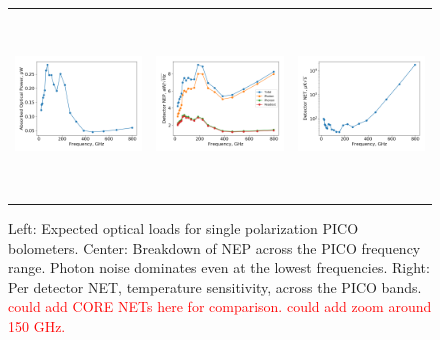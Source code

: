 \documentclass[]{spie}  %
\newcommand{\comr}[1]{\textcolor{red}{#1}}
\begin{document}
\begin{figure} [ht]
\begin{center}
\begin{tabular}{ccc} %
\hspace{-1.4cm} \includegraphics[height=4.9cm]{system_Popt.png} & \hspace{-0.7cm} \includegraphics[height=4.9cm]{system_NEP.png} &\hspace{-0.7cm}  \includegraphics[height=4.9cm]{system_NET.png} 
\end{tabular}
\end{center}
\caption{ \label{fig:popt} \label{fig:noise} \label{fig:net} 
Left: Expected optical loads for single polarization PICO bolometers. 
Center: 
 Breakdown of NEP across the PICO frequency range.  Photon noise dominates even at the lowest frequencies. 
Right: Per detector NET, temperature sensitivity,  across the PICO bands. \comr{could add CORE NETs here for comparison. could add zoom around 150 GHz.}
}
\end{figure} 
\end{document}
